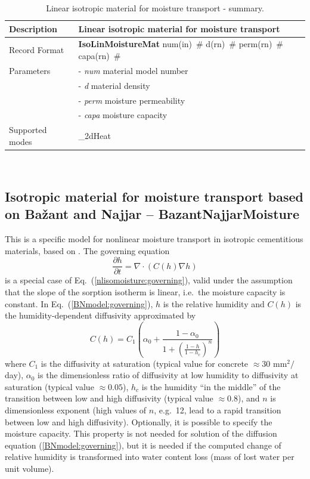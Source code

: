 \documentclass[a4paper]{article}
\newcommand{\descitem}[1]{{\noindent \bf #1}}
\newcommand{\elemparam}[2]{{{#1\tiny (#2)}~\#}}
\newcommand{\param}[1]{{\it #1}}
\newcommand{\refeq}[1]{Eq.~(\ref{#1})}
\newenvironment{mmt}{\begin{tabular}{|l|p{9cm}|}}{\end{tabular}\\}
\newenvironment{mmt}{\begin{tabular}{|l|l|}}{\end{tabular}\\}
\begin{document}
\begin{table}[!htb]
\begin{mmt}
\hline
Description & Linear isotropic material for moisture transport\\
\hline
Record Format & \descitem{IsoLinMoistureMat} \elemparam{num}{in}
\elemparam{d}{rn} \elemparam{perm}{rn} \elemparam{capa}{rn}\\
Parameters &- \param{num} material model number\\
&- \param{d} material density\\
&- \param{perm} moisture permeability\\
&- \param{capa} moisture capacity\\
Supported modes& \_2dHeat\\
\hline
\end{mmt}
\caption{Linear isotropic material for moisture transport - summary.}
\label{IsoLinmoistureMat_table}
\end{table}

\subsection{Isotropic material for moisture transport based on Ba\v{z}ant
  and Najjar -- BazantNajjarMoisture}
\label{sec:BazantNajjarMoistureMat}
This is a specific model for nonlinear moisture transport in isotropic cementitious
materials, based on \cite{Bazant:72}.
The governing equation 
\begin{equation}\label{BNmodel:governing}
\frac{\partial h}{\partial t} = \nabla \cdot \left( C(h) \nabla h \right)
\end{equation} 
is a special case of \refeq{nlisomoisture:governing}, valid under
the assumption that the slope of the sorption isotherm is linear, i.e.\ the
moisture capacity is constant.
In \refeq{BNmodel:governing}, $h$ is the relative humidity and $C(h)$ is the
humidity-dependent diffusivity approximated by
\begin{equation}\label{BNmodel:diffusivity}
C (h) = C_1 \left( \alpha_0
+ \frac{1-\alpha_0}{1+\left(\frac{1-h}{1-h_c}\right)^n} \right)
\end{equation}
where $C_1$ is the diffusivity at saturation (typical value for concrete
$\approx 30$ mm$^2/$day), $\alpha_0$ is the dimensionless ratio of
diffusivity at low humidity to diffusivity at saturation (typical
value $\approx 0.05$), $h_c$ is the humidity ``in the middle'' of the
transition between low and high diffusivity (typical value $\approx 0.8$), and $n$ is dimensionless
exponent (high values of $n$, e.g.\ 12, lead to a rapid transition
between low and high diffusivity). Optionally, it is possible to
specify the moisture capacity. This property is not needed for solution
of the diffusion equation  (\ref{BNmodel:governing}),
but it is needed if the computed change of relative humidity is transformed     
into water content loss (mass of lost water per unit volume).
\end{document}
